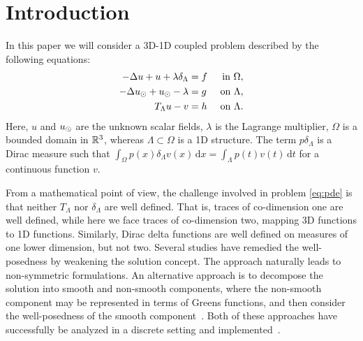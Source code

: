 \documentclass[r]{siamart171218}
\begin{document}
\section{Introduction}\label{sec:intro}

In this paper we will consider a 3D-1D coupled problem described by the following equations: 
\begin{subequations}
\label{eq:pde}
\begin{align}
\label{eq:pde1}
  -\Delta u + u + \lambda \delta_{\Lambda} &= f &\mbox{ in } \Omega,\\
\label{eq:pde2}
-\Delta \ud + \ud - \lambda &= g &\mbox{ on } \Lambda,\\
\label{eq:coupling}
T_\Lambda u - v  &=  h &\mbox{ on } \Lambda . 
\end{align}
\end{subequations}
Here, $u$ and $u_{\odot}$ are the unknown scalar fields,  $\lambda$ is the Lagrange multiplier,  $\Omega$ is a bounded domain in $\mathbb{R}^3$, whereas $\Lambda \subset \Omega$ is a 1D structure. 
The term $p\delta_{\Lambda}$ is a Dirac measure such that 
$\int_{\Omega}p(x)\delta_{\Lambda}v(x)\,\mathrm{d}x=\int_{\Lambda}p(t)v(t) \,\mathrm{d}t$
for a continuous function $v$. 



From a mathematical point of view, the challenge involved in problem \eqref{eq:pde} is that neither $T_\Lambda$ nor $\delta_\Lambda$ are well defined. That is, traces of co-dimension one are well defined, while here we face traces of co-dimension two, mapping 3D functions to 1D functions. Similarly, Dirac delta functions are well defined on measures of one lower dimension, but not two. Several studies \cite{DAngelo,..} have remedied the well-posedness by weakening the solution concept. The approach naturally leads to non-symmetric formulations. An alternative approach is to decompose the solution into smooth and non-smooth components, where the non-smooth component may be represented in terms of Greens functions, and then consider the well-posedness of the smooth component~\cite{Peaceman1983531,secomb2004green}. Both of these approaches have successfully be analyzed in a discrete setting and implemented~\cite{}. 
\end{document}

